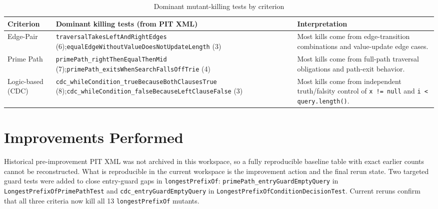 \begin{table}[H]
	\centering
	\scriptsize
	\setlength{\tabcolsep}{3pt}
	\renewcommand{\arraystretch}{1.15}
	\begin{tabular}{|p{2.1cm}|p{4.9cm}|p{6.6cm}|}
		\hline
		Criterion & Dominant killing tests (from PIT XML) & Interpretation \\
		\hline
		Edge-Pair & \texttt{traversalTakesLeftAnd}\newline \texttt{RightEdges} (6);\newline \texttt{equalEdgeWithoutValue}\newline \texttt{DoesNotUpdateLength} (3) & Most kills come from edge-transition combinations and value-update edge cases. \\
		\hline
		Prime Path & \texttt{primePath\_rightThen}\newline \texttt{EqualThenMid} (7);\newline \texttt{primePath\_exitsWhen}\newline \texttt{SearchFallsOffTrie} (4) & Most kills come from full-path traversal obligations and path-exit behavior. \\
		\hline
		Logic-based (CDC) & \texttt{cdc\_whileCondition\_true}\newline \texttt{BecauseBothClausesTrue} (8);\newline \texttt{cdc\_whileCondition\_false}\newline \texttt{BecauseLeftClauseFalse} (3) & Most kills come from independent truth/falsity control of \texttt{x != null} and \texttt{i < query.length()}. \\
		\hline
	\end{tabular}
	\normalsize
	\caption{Dominant mutant-killing tests by criterion}
\end{table}

\section{Improvements Performed}

Historical pre-improvement PIT XML was not archived in this workspace, so a fully reproducible baseline table with exact earlier counts cannot be reconstructed.
What is reproducible in the current workspace is the improvement action and the final rerun state.
Two targeted guard tests were added to close entry-guard gaps in \texttt{longestPrefixOf}:
\texttt{primePath\_entryGuardEmptyQuery} in \texttt{LongestPrefixOfPrimePathTest} and
\texttt{cdc\_entryGuardEmptyQuery} in \texttt{LongestPrefixOfConditionDecisionTest}.
Current reruns confirm that all three criteria now kill all 13 \texttt{longestPrefixOf} mutants.

